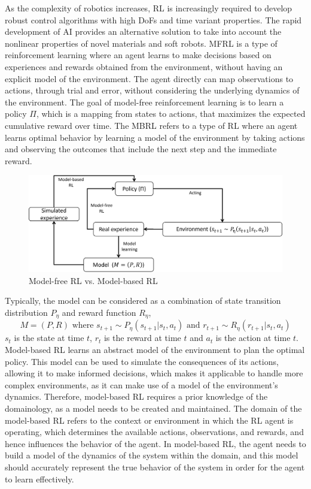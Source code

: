 As the complexity of robotics increases, \ac{RL} is increasingly required to develop robust control algorithms with high \ac{DoF}s and time variant properties\cite{zhangEffectiveSoftRobot2017}. The rapid development of AI provides an alternative solution to take into account the nonlinear properties of novel materials and soft robots\cite{tangModelbasedOnlineLearning2021}. \ac{MFRL} is a type of reinforcement learning where an agent learns to make decisions based on experiences and rewards obtained from the environment, without having an explicit model of the environment. The agent directly can map observations to actions, through trial and error, without considering the underlying dynamics of the environment\cite{arulkumaranDeepReinforcementLearning2017}. The goal of model-free reinforcement learning is to learn a policy $\Pi$, which is a mapping from states to actions, that maximizes the expected cumulative reward over time. The \ac{MBRL} refers to a type of \ac{RL} where an agent learns optimal behavior by learning a model of the environment by taking actions and observing the outcomes that include the next step and the immediate reward\cite{rayModelBasedReinforcementLearning2010}. 
\begin{figure}[hp]
    \centering
    \includegraphics[width=\textwidth]{figures/model.png}
    \caption{Model-free \ac{RL} vs. Model-based \ac{RL}}
    \label{fig:demo}
\end{figure}

Typically, the model can be considered as a combination of state transition distribution $P_\eta$ and reward function $R_\eta$, $$M = (P,R) \textrm{ where } s_{t+1}\sim P_\eta(s_{t+1}|s_t, a_t) \textrm{ and } r_{t+1}\sim R_\eta(r_{t+1}|s_t, a_t)$$ $s_t$ is the state at time $t$, $r_t$ is the reward at time $t$ and $a_t$ is the action at time $t$. Model-based \ac{RL} learns an abstract model of the environment to plan the optimal policy. This model can be used to simulate the consequences of its actions, allowing it to make informed decisions, which makes it applicable to handle more complex environments, as it can make use of a model of the environment's dynamics. Therefore, model-based \ac{RL} requires a prior knowledge of the domainology\cite{tangModelbasedOnlineLearning2021}, as a model needs to be created and maintained. The domain of the model-based \ac{RL} refers to the context or environment in which the \ac{RL} agent is operating, which determines the available actions, observations, and rewards, and hence influences the behavior of the agent\cite{langExplorationRelationalDomains}. In model-based \ac{RL}, the agent needs to build a model of the dynamics of the system within the domain, and this model should accurately represent the true behavior of the system in order for the agent to learn effectively.

